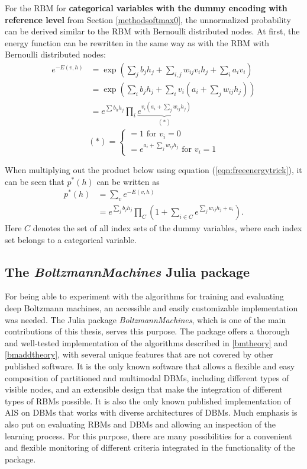\documentclass[12pt]{article}
\newcommand{\apkg}[1]{\emph{#1}}
\begin{document}
For the RBM for {\bf categorical variables with the dummy encoding with reference level} from Section \ref{methodsoftmax0}, the unnormalized probability can be derived similar to the RBM with Bernoulli distributed nodes. At first, the energy function can be rewritten in the same way as with the RBM with Bernoulli distributed nodes:
\begin{align}
e^{-E(v,h)} &= \exp \left(\sum_j b_j h_j + \sum_{i,j} w_{ij} v_i h_j + \sum_i a_i v_i \right) \nonumber \\
&= \exp \left( \sum_i b_j h_j + \sum_i v_i \left( a_i + \sum_j w_{ij} h_j \right) \right) \nonumber \\
&= e^{\sum b_h h_j} \prod_i \underbrace{e^{v_i (a_i + \sum_j w_{ij} h_j)}}_{(*)}
\label{eqn:freeenergytrick}
\end{align}
\begin{equation*}
(*) = \left\{
\begin{array}{l}
 =1 \text{ for } v_i = 0 \\
 = e^{a_i +\sum_j w_{ij} h_j} \text{ for } v_i = 1
\end{array} \right.
\end{equation*}

When multiplying out the product below using equation (\ref{eqn:freeenergytrick}), it can be seen that $p^*(h)$ can be written as
\begin{align*}
p^*(h) &= \sum_v e^{-E(v,h)} \\
&= e^{\sum_j b_j h_j} \prod_{C} \left( 1 + \sum_{i \in C} e^{\sum_j w_{ij} h_j + a_i} \right).
\end{align*}
Here $C$ denotes the set of all index sets of the dummy variables, where each index set belongs to a categorical variable.

\subsection{The \apkg{BoltzmannMachines} Julia package}
For being able to experiment with the algorithms for training and evaluating deep Boltzmann machines, an accessible and easily customizable implementation was needed.
The Julia package \apkg{BoltzmannMachines}, which is one of the main contributions of this thesis, serves this purpose.
The package offers a thorough and well-tested implementation of the algorithms described in \ref{bmtheory} and \ref{bmaddtheory}, with several unique features that are not covered by other published software.
It is the only known software that allows a flexible and easy composition of partitioned and multimodal DBMs, including different types of visible nodes, and an extensible design that make the integration of different types of RBMs possible.
It is also the only known published implementation of AIS on DBMs that works with diverse architectures of DBMs.
Much emphasis is also put on evaluating RBMs and DBMs and allowing an inspection of the learning process.
For this purpose, there are many possibilities for a convenient and flexible monitoring of different criteria integrated in the functionality of the package.
\end{document}

